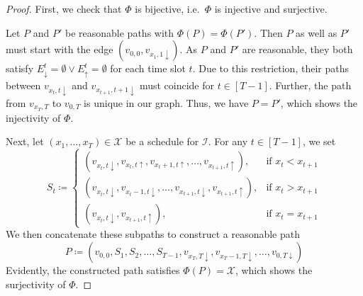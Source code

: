 \documentclass[hidelinks]{article}
\theoremstyle{plain}
\theoremstyle{definition}
\theoremstyle{rem}
\newcommand{\mx}{\mathcal{X}}
\newcommand{\inp}{\mathcal{I}}
\begin{document}
\begin{proof}
First, we check that $\Phi$ is bijective, i.e.\ $\Phi$ is injective and surjective. 

Let $P$ and $P'$ be reasonable paths with $\Phi(P)=\Phi(P')$. Then $P$ as well as $P'$ must start with the edge $(v_{0,0},v_{x_1,1\downarrow})$. As $P$ and $P'$ are reasonable, they both satisfy $E_\downarrow^t=\emptyset \lor E_\uparrow^t=\emptyset$ for each time slot $t$. Due to this restriction, their paths between $v_{x_t,t\downarrow}$ and $v_{x_{t+1},t+1\downarrow}$ must coincide for $t\in[T-1]$. Further, the path from $v_{x_T,T}$ to $v_{0,T}$ is unique in our graph. Thus, we have $P=P'$, which shows the injectivity of $\Phi$.

Next, let $(x_1,\ldots,x_T)\in\bm{\mx}$ be a schedule for $\inp$. For any $t\in[T-1]$, we set
\begin{equation*}
	S_t\coloneqq
	\begin{cases}
		(v_{x_t,t\downarrow},v_{x_t,t\uparrow},v_{x_t+1,t\uparrow},\ldots,v_{x_{t+1},t\uparrow}), & \text{if $x_t<x_{t+1}$}\\
		(v_{x_t,t\downarrow},v_{x_t-1,t\downarrow},\ldots,v_{x_{t+1},t\downarrow},v_{x_{t+1},t\uparrow}), & \text{if $x_t>x_{t+1}$}\\
		(v_{x_t,t\downarrow},v_{x_{t+1},t\uparrow}), & \text{if $x_t=x_{t+1}$}
	\end{cases}
\end{equation*}
We then concatenate these subpaths to construct a reasonable path
\begin{equation*}
	P\coloneqq(v_{0,0},S_1,S_2,\ldots,S_{T-1},v_{x_T,T\downarrow},v_{x_T-1,T\downarrow},\ldots,v_{0,T\downarrow})
\end{equation*}
Evidently, the constructed path satisfies $\Phi(P)=\mx$, which shows the surjectivity of $\Phi$.


\end{proof}
\end{document}
